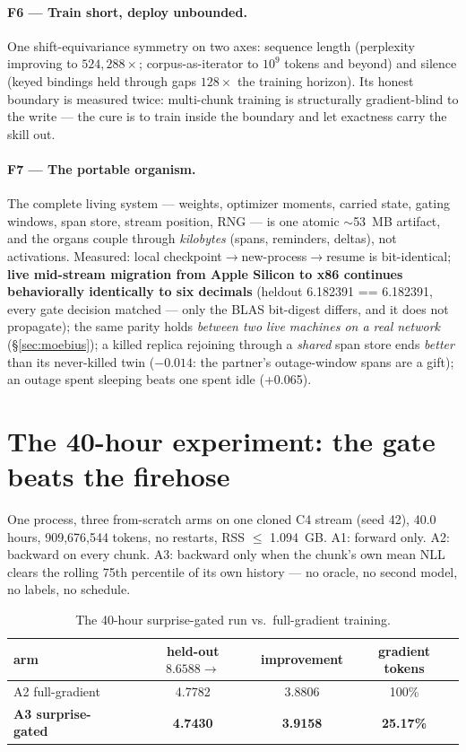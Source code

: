 \documentclass[11pt]{article}
\theoremstyle{definition}
\begin{document}
\paragraph{F6 --- Train short, deploy unbounded.} One shift-equivariance
symmetry on two axes: sequence length (perplexity improving to
$524{,}288\times$; corpus-as-iterator to $10^9$ tokens and beyond) and
silence (keyed bindings held through gaps $128\times$ the training horizon).
Its honest boundary is measured twice: multi-chunk training is structurally
gradient-blind to the write --- the cure is to train inside the boundary and
let exactness carry the skill out.

\paragraph{F7 --- The portable organism.} The complete living system ---
weights, optimizer moments, carried state, gating windows, span store,
stream position, RNG --- is one atomic $\sim$53~MB artifact, and the organs
couple through \emph{kilobytes} (spans, reminders, deltas), not activations.
Measured: local checkpoint$\to$new-process$\to$resume is bit-identical;
\textbf{live mid-stream migration from Apple Silicon to x86 continues
behaviorally identically to six decimals} (heldout 6.182391 == 6.182391,
every gate decision matched --- only the BLAS bit-digest differs, and it
does not propagate); the same parity holds \emph{between two live machines
on a real network} (\S\ref{sec:moebius}); a killed replica rejoining through
a \emph{shared} span store ends \emph{better} than its never-killed twin
($-0.014$: the partner's outage-window spans are a gift); an outage spent
sleeping beats one spent idle (+0.065).

\section{The 40-hour experiment: the gate beats the firehose}
\label{sec:40h}

One process, three from-scratch arms on one cloned C4 stream (seed 42), 40.0
hours, 909{,}676{,}544 tokens, no restarts, RSS $\le$ 1.094~GB. A1: forward
only. A2: backward on every chunk. A3: backward only when the chunk's own
mean NLL clears the rolling 75th percentile of its own history --- no
oracle, no second model, no labels, no schedule.

\begin{table}[tb]
\centering
\caption{The 40-hour surprise-gated run vs.\ full-gradient training.}
\label{tab:40h}
\begin{tabular}{@{}lccc@{}}
\toprule
arm & held-out $8.6588 \to$ & improvement & gradient tokens\\
\midrule
A2 full-gradient & 4.7782 & 3.8806 & 100\%\\
\textbf{A3 surprise-gated} & \textbf{4.7430} & \textbf{3.9158} & \textbf{25.17\%}\\
\bottomrule
\end{tabular}
\end{table}
\end{document}
